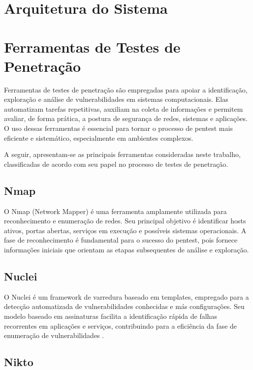 \section{Arquitetura do Sistema}

\section{Ferramentas de Testes de Penetração}
    Ferramentas de testes de penetração são empregadas para apoiar a identificação, exploração e análise de vulnerabilidades
    em sistemas computacionais. Elas automatizam tarefas repetitivas, auxiliam na coleta de informações e permitem avaliar,
    de forma prática, a postura de segurança de redes, sistemas e aplicações. O uso dessas ferramentas
    é essencial para tornar o processo de pentest mais eficiente e sistemático, especialmente em ambientes complexos\citep{moreno2019introduccao}.

    A seguir, apresentam-se as principais ferramentas consideradas neste trabalho, classificadas de acordo com seu papel no processo de testes de penetração.

        \subsection{Nmap}

            O Nmap (Network Mapper) é uma ferramenta amplamente utilizada para reconhecimento e enumeração de redes. Seu principal
            objetivo é identificar hosts ativos, portas abertas, serviços em execução e possíveis sistemas operacionais. A fase de reconhecimento 
            é fundamental para o sucesso do pentest, pois fornece informações iniciais que orientam as etapas
            subsequentes de análise e exploração\citep{stallings2017network}.

        \subsection{Nuclei}

            O Nuclei é um framework de varredura baseado em templates, empregado para a detecção automatizada de vulnerabilidades conhecidas e más configurações.
            Seu modelo baseado em assinaturas facilita a identificação rápida de falhas recorrentes em aplicações e serviços, contribuindo para a eficiência da
            fase de enumeração de vulnerabilidades \citep{moreno2019introduccao}.
            
        \subsection{Nikto}

